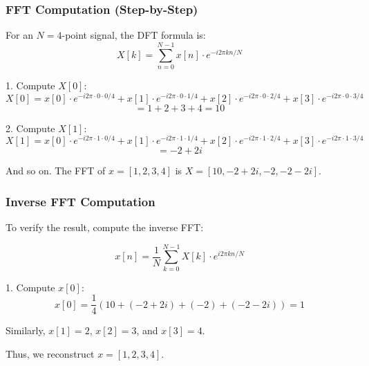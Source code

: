 \documentclass{article}
\begin{document}
\subsubsection{FFT Computation (Step-by-Step)}

For an \( N = 4 \)-point signal, the DFT formula is:
\[
X[k] = \sum_{n=0}^{N-1} x[n] \cdot e^{-i 2 \pi k n / N}
\]

1. Compute \( X[0] \):
\[
X[0] = x[0] \cdot e^{-i 2 \pi \cdot 0 \cdot 0 / 4} + x[1] \cdot e^{-i 2 \pi \cdot 0 \cdot 1 / 4} + x[2] \cdot e^{-i 2 \pi \cdot 0 \cdot 2 / 4} + x[3] \cdot e^{-i 2 \pi \cdot 0 \cdot 3 / 4}
\]
\[
= 1 + 2 + 3 + 4 = 10
\]

2. Compute \( X[1] \):
\[
X[1] = x[0] \cdot e^{-i 2 \pi \cdot 1 \cdot 0 / 4} + x[1] \cdot e^{-i 2 \pi \cdot 1 \cdot 1 / 4} + x[2] \cdot e^{-i 2 \pi \cdot 1 \cdot 2 / 4} + x[3] \cdot e^{-i 2 \pi \cdot 1 \cdot 3 / 4}
\]
\[
= -2 + 2i
\]

And so on. The FFT of \( x = [1, 2, 3, 4] \) is \( X = [10, -2 + 2i, -2, -2 - 2i] \).

\subsubsection{Inverse FFT Computation}
To verify the result, compute the inverse FFT:

\[
x[n] = \frac{1}{N} \sum_{k=0}^{N-1} X[k] \cdot e^{i 2 \pi k n / N}
\]

1. Compute \( x[0] \):
\[
x[0] = \frac{1}{4} (10 + (-2 + 2i) + (-2) + (-2 - 2i)) = 1
\]

Similarly, \( x[1] = 2 \), \( x[2] = 3 \), and \( x[3] = 4 \).

Thus, we reconstruct \( x = [1, 2, 3, 4] \).
\end{document}
